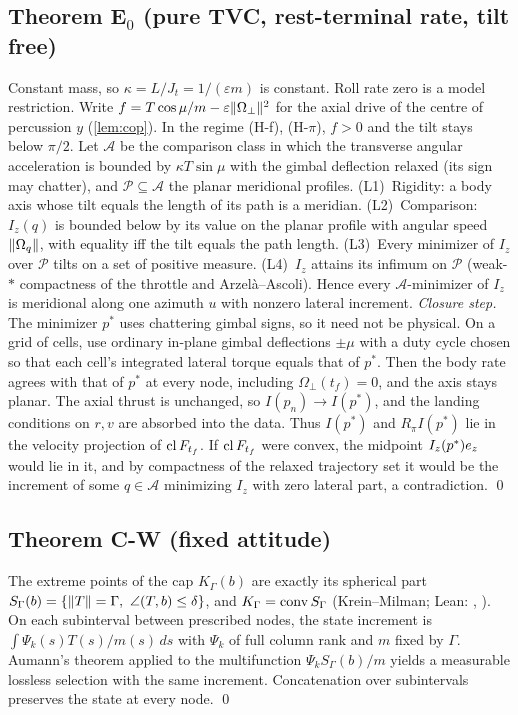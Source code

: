 \subsection{Theorem E$_0$ (pure TVC, rest-terminal rate, tilt free)}
Constant mass, so
$\kappa=L/J_t=1/(\varepsilon m)$ is constant. Roll rate zero is a model restriction. Write $f=T\cos\mu/m-\varepsilon\lVert \Omega_\perp\rVert^2$ for the
axial drive of the centre of percussion $y$ (\cref{lem:cop}). In the regime (H-f), (H-$\pi$), $f>0$ and the tilt stays below $\pi/2$.
Let $\mathcal A$ be the comparison class in which the transverse angular acceleration is bounded by $\kappa T\sin\mu$ with the gimbal
deflection relaxed (its sign may chatter), and $\mathcal P\subseteq\mathcal A$ the planar meridional profiles.
(L1)~Rigidity: a body axis whose tilt equals the length of its path is a meridian. (L2)~Comparison: $I_z(q)$ is bounded below by its
value on the planar profile with angular speed $\lVert \Omega_q\rVert$, with equality iff the tilt equals the path length. (L3)~Every
minimizer of $I_z$ over $\mathcal P$ tilts on a set of positive measure. (L4)~$I_z$ attains its infimum on $\mathcal P$ (weak-$*$ compactness
of the throttle and Arzel\`a--Ascoli). Hence every $\mathcal A$-minimizer of $I_z$ is meridional along one azimuth $u$ with nonzero lateral
increment.
\emph{Closure step.} The minimizer $p^*$ uses chattering gimbal signs, so it need not be physical. On a grid of cells, use ordinary
in-plane gimbal deflections $\pm\mu$ with a duty cycle chosen so that each cell's integrated lateral torque equals that of $p^*$. Then the
body rate agrees with that of $p^*$ at every node, including $\Omega_\perp(t_f)=0$, and the axis stays planar. The axial thrust is
unchanged, so $I(p_n)\to I(p^*)$, and the landing conditions on $r,v$ are absorbed into the data. Thus $I(p^*)$ and $R_\pi I(p^*)$ lie in
the velocity projection of $\operatorname{cl}F_{t_f}$. If $\operatorname{cl}F_{t_f}$ were convex, the midpoint $I_z(p^*)e_z$ would lie in it, and by compactness of the
relaxed trajectory set it would be the increment of some $q\in\mathcal A$ minimizing $I_z$ with zero lateral part, a contradiction. \qed

\subsection{Theorem C-W (fixed attitude)}
The extreme points of the cap $K_\Gamma(b)$ are exactly its spherical part
$S_\Gamma(b)=\{\norm T=\Gamma,\ \angle(T,b)\le\delta\}$, and $K_\Gamma=\operatorname{conv} S_\Gamma$ (Krein--Milman; Lean: ,
). On each subinterval between prescribed nodes, the state increment is
$\int\Psi_k(s)T(s)/m(s)\,ds$ with $\Psi_k$ of full column rank and $m$ fixed by $\Gamma$. Aumann's theorem applied to the multifunction
$\Psi_kS_\Gamma(b)/m$ yields a measurable lossless selection with the same increment. Concatenation over subintervals preserves the state at
every node. \qed

